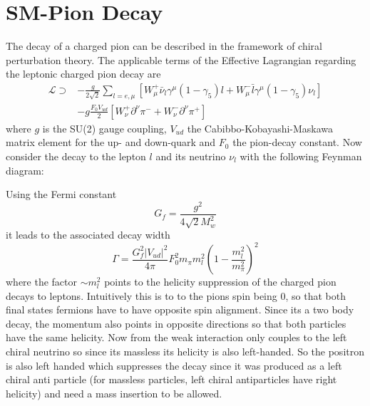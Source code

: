\chapter{SM-Pion Decay}
\label{ch:SM-PionDecay}
The decay of a charged pion can be described in the framework of chiral perturbation theory.
The applicable terms of the Effective Lagrangian regarding the leptonic charged pion decay are \cite{Scherer:2002tk} 
\begin{align*}
\mathcal{L} \supset &-\frac{g}{2\sqrt{2}}\sum_{l=e,\mu}\left[W_\mu^+\bar{\nu}_l \gamma^\mu(1-\gamma_5)l +W_\mu^-\bar{l}\gamma^\mu(1-\gamma_5)\nu_l\right]\\
&-g\frac{F_0 V_{ud}}{2}\left[ W^+_\nu\partial^\nu\pi^-+W^-_\nu\partial^\nu\pi^+\right]
\end{align*}
where $g$ is the SU(2) gauge coupling, $V_{ud}$ the Cabibbo-Kobayashi-Maskawa matrix element for the up- and down-quark and $F_0$ the pion-decay constant.
Now consider the decay to the lepton $l$ and its neutrino $\nu_l$ with the following Feynman diagram:
\begin{figure}[!h]
\centering
{}
\end{figure}
Using the Fermi constant
\begin{equation}
G_f= \frac{g^2}{4\sqrt{2}M_w^2}
\end{equation}
it leads to the associated decay width
\begin{equation}
\label{eq:Pion_Wdth}
\Gamma = \frac{G_f^2 |V_{ud}|^2}{4\pi}F_0^2 m_\pi m_l^2\left(1-\frac{m_l^2}{m_\pi^2}\right)^2
\end{equation}
where the factor $\sim m_l^2$ points to the helicity suppression of the charged pion decays to leptons. Intuitively this is to to the pions spin being 0, so that both final states fermions have to have opposite spin alignment. Since its a two body decay, the momentum also points in opposite directions so that both particles have the same helicity. Now from the weak interaction only couples to the left chiral neutrino so since its massless its helicity is also left-handed. So the positron is also left handed which suppresses the decay since it was produced as a left chiral anti particle (for massless particles, left chiral antiparticles have right helicity) and need a mass insertion to be allowed.
